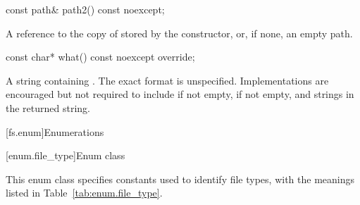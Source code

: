 %
\begin{itemdecl}
const path& path2() const noexcept;
\end{itemdecl}

\begin{itemdescr}
\pnum
\returns A reference to the copy of  stored by the
  constructor, or, if none, an empty path.
\end{itemdescr}

%
\begin{itemdecl}
const char* what() const noexcept override;
\end{itemdecl}

\begin{itemdescr}
\pnum
\returns A string containing . The exact format is unspecified.
  Implementations are encouraged but not required to include 
  if not empty,  if not empty, and  strings in the returned
  string.
\end{itemdescr}

[fs.enum]{Enumerations}

[enum.file_type]{Enum class }

%
\pnum
This enum class specifies constants used to identify file types,
with the meanings listed in Table~\ref{tab:enum.file_type}.

